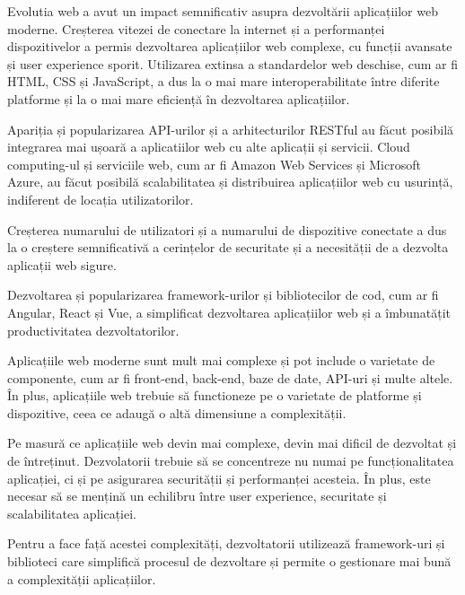 \documentclass[12pt, a4paper]{report}
\begin{document}
Evolutia web a avut un impact semnificativ asupra dezvoltării aplicațiilor web moderne. Creșterea vitezei de conectare la internet și a performanței dispozitivelor a permis dezvoltarea aplicațiilor web complexe, cu funcții avansate și user experience sporit. Utilizarea extinsa a standardelor web deschise, cum ar fi HTML, CSS și JavaScript, a dus la o mai mare interoperabilitate între diferite platforme și la o mai mare eficiență în dezvoltarea aplicațiilor.

Apariția și popularizarea API-urilor și a arhitecturilor RESTful au făcut posibilă integrarea mai ușoară a aplicatiilor web cu alte aplicații și servicii. Cloud computing-ul și serviciile web, cum ar fi Amazon Web Services și Microsoft Azure, au făcut posibilă scalabilitatea și distribuirea aplicațiilor web cu usurință, indiferent de locația utilizatorilor.

Creșterea numarului de utilizatori și a numarului de dispozitive conectate a dus la o creștere semnificativă a cerințelor de securitate și a necesității de a dezvolta aplicații web sigure.

Dezvoltarea și popularizarea framework-urilor și bibliotecilor de cod, cum ar fi Angular, React și Vue, a simplificat dezvoltarea aplicațiilor web și a îmbunatățit productivitatea dezvoltatorilor.

Aplicațiile web moderne sunt mult mai complexe și pot include o varietate de componente, cum ar fi front-end, back-end, baze de date, API-uri și multe altele. În plus, aplicațiile web trebuie să functioneze pe o varietate de platforme și dispozitive, ceea ce adaugă o altă dimensiune a complexității.

Pe masură ce aplicațiile web devin mai complexe, devin mai dificil de dezvoltat și de întreținut. Dezvolatorii trebuie să se concentreze nu numai pe funcționalitatea aplicației, ci și pe asigurarea securității și performanței acesteia. În plus, este necesar să se mențină un echilibru între user experience, securitate și scalabilitatea aplicației.

Pentru a face față acestei complexități, dezvoltatorii utilizează framework-uri și biblioteci care simplifică procesul de dezvoltare și permite o gestionare mai bună a complexității aplicațiilor.
\end{document}
